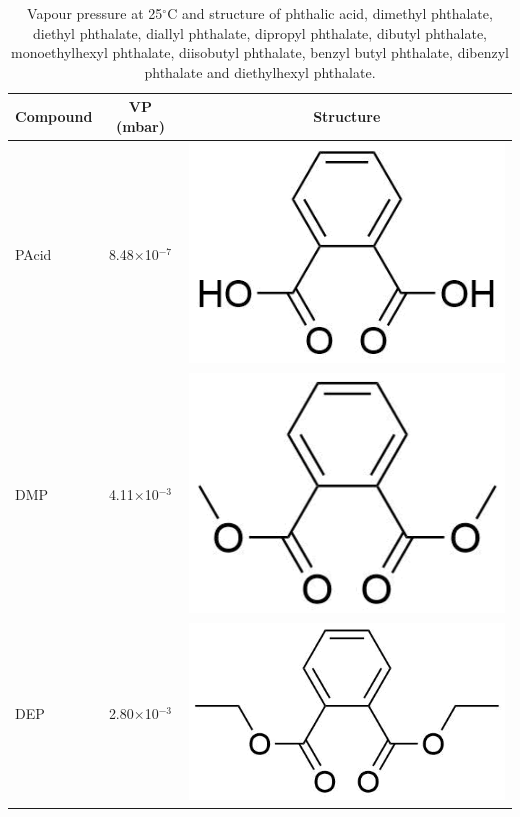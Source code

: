 {\small

\begin{table}
\centering
\caption{Vapour pressure at 25$^\circ$C and structure of phthalic acid, dimethyl phthalate, diethyl phthalate, diallyl phthalate, dipropyl phthalate, dibutyl phthalate, monoethylhexyl phthalate, diisobutyl phthalate, benzyl butyl phthalate, dibenzyl phthalate and diethylhexyl phthalate.}
\begin{tabular}{lcc}
\textbf{Compound} &  \textbf{VP (mbar)} &  \textbf{Structure} \\ 
\toprule
PAcid &   8.48$\times$10$^{-7}$ &  \begin{minipage}[c]{0.35\linewidth}\centering
\includegraphics[height=0.07\textheight]{pics/PH/PAcid_struct2.png}\end{minipage}\\ \midrule
DMP &    4.11$\times$10$^{-3}$ &  \begin{minipage}[c]{0.35\linewidth}\centering
\includegraphics[height=0.07\textheight]{pics/PH/DMP_struct2.png}\end{minipage}\\ \midrule
DEP &   2.80$\times$10$^{-3}$ &  \begin{minipage}[c]{0.35\linewidth}\centering
\includegraphics[height=0.07\textheight]{pics/PH/DEP_struct2.png}\end{minipage}\\ \midrule

\end{tabular}
\end{table}}
